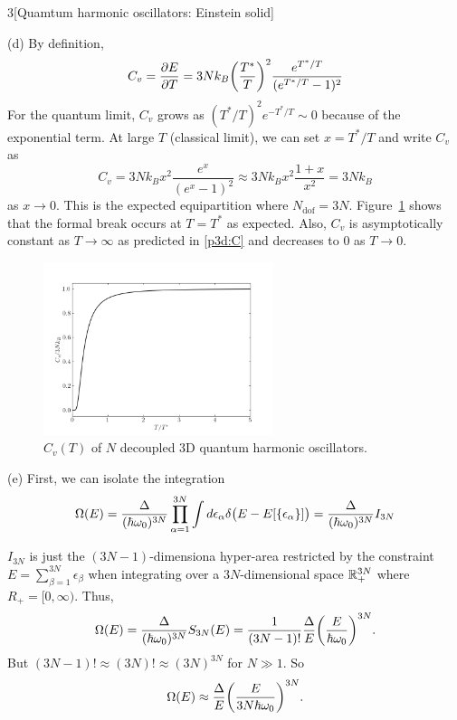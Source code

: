 \documentclass[12pt]{article}
\begin{document}
\begin{problem}{3}[Quamtum harmonic oscillators: Einstein solid]
\begin{solution}
(d) By definition,
\begin{equation}
    C_v=\frac{\partial E}{\partial T}
    =3Nk_B\qty(\frac{T^\ast}{T})^2\frac{e^{T^\ast/T}}{(e^{T^\ast/T}-1)^2}
\end{equation}
For the quantum limit, $C_v$ grows as $(T^\ast/T)^2e^{-T^\ast/T}\sim0$ because
of the exponential term. At large $T$ (classical limit), we can set $x=T^\ast/T$
and write $C_v$ as
\begin{equation}\label{p3d:C}
    C_v=3Nk_Bx^2\frac{e^x}{(e^x-1)^2}\approx3Nk_Bx^2\frac{1+x}{x^2}=3Nk_B 
\end{equation}
as $x\to0$. This is the expected equipartition where $N_\text{dof}=3N$.
Figure~\ref{fig:p3d} shows that the formal break occurs at $T=T^\ast$ as
expected. Also, $C_v$ is asymptotically constant as $T\to\infty$ as predicted in
\eqref{p3d:C} and decreases to 0 as $T\to0$.

\begin{figure}[H]
    \centering
    \includegraphics[width=0.6\textwidth]{p3d.png}
    \caption{$C_v(T)$ of $N$ decoupled 3D quantum harmonic oscillators.}
    \label{fig:p3d}
\end{figure}

(e) First, we can isolate the integration
\begin{equation}
    \Omega(E)=\frac{\Delta}{(\hbar\omega_0)^{3N}}
    \prod_{\alpha=1}^{3N}\int
    d\epsilon_\alpha\delta\qty(E-E[\qty{\epsilon_\alpha}])
    =\frac{\Delta}{(\hbar\omega_0)^{3N}}I_{3N}
\end{equation}

$I_{3N}$ is just the $(3N-1)$-dimensiona hyper-area restricted by the constraint
$E=\sum_{\beta=1}^{3N}\epsilon_\beta$ when integrating over a $3N$-dimensional
space $\mathbb{R}_+^{3N}$ where $R_+=[0,\infty)$. Thus,
\begin{equation}
     \Omega(E)=\frac{\Delta}{(\hbar\omega_0)^{3N}}S_{3N}(E)
     =\frac1{(3N-1)!}\frac{\Delta}{E}\qty(\frac{E}{\hbar\omega_0})^{3N}.
\end{equation}
But $(3N-1)!\approx (3N)!\approx (3N)^{3N}$ for $N\gg1$. So
\begin{equation}
    \Omega(E)\approx\frac{\Delta}{E}\qty(\frac{E}{3N\hbar\omega_0})^{3N} .
\end{equation}

\end{solution}
\end{problem}
\end{document}

